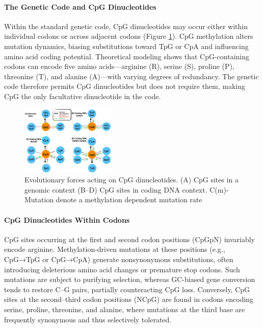\documentclass[10pt]{extarticle}
\begin{document}
\paragraph{The Genetic Code and CpG Dinucleotides}
Within the standard genetic code, CpG dinucleotides may occur either within individual codons or across adjacent codons (Figure \ref{fig:CpG}). CpG methylation alters mutation dynamics, biasing substitutions toward TpG or CpA and influencing amino acid coding potential. Theoretical modeling shows that CpG-containing codons can encode five amino acids—arginine (R), serine (S), proline (P), threonine (T), and alanine (A)—with varying degrees of redundancy. The genetic code therefore permits CpG dinucleotides but does not require them, making CpG the only facultative dinucleotide in the code.

\begin{figure}[h]
    \centering
    \includegraphics[width=0.4\textwidth]{Figures/Evolutionary forces acting on CpG dinucleotides.jpg} %
    \caption{Evolutionary forces acting on CpG dinucleotides. (A) CpG sites in a genomic context (B–D) CpG sites in coding DNA context. C(m)-Mutation
denote a methylation dependent mutation rate}
    \label{fig:CpG}
\end{figure}

\paragraph{CpG Dinucleotides Within Codons}
CpG sites occurring at the first and second codon positions (CpGpN) invariably encode arginine. Methylation-driven mutations at these positions (e.g., CpG→TpG or CpG→CpA) generate nonsynonymous substitutions, often introducing deleterious amino acid changes or premature stop codons. Such mutations are subject to purifying selection, whereas GC-biased gene conversion tends to restore C–G pairs, partially counteracting CpG loss. Conversely, CpG sites at the second–third codon positions (NCpG) are found in codons encoding serine, proline, threonine, and alanine, where mutations at the third base are frequently synonymous and thus selectively tolerated.
\end{document}
